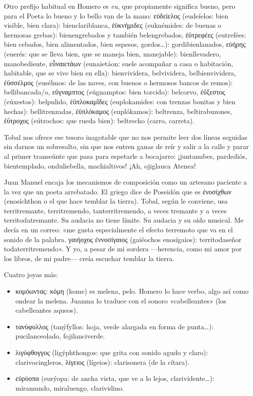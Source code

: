 \documentclass[11pt,a4paper]{article}
\newcommand{\gr}[1]{\foreignlanguage{greek}{#1}}
\begin{document}
Otro prefijo habitual en Homero es \emph{eu}, que propiamente significa bueno, pero para el Poeta lo bueno y lo bello van de la mano: \gr{εὐδείελος} (eudeíelos: bien visible, bien clara): bienclariblanca, \gr{ἐϋκνήμιδες} (euknémides: de buenas o hermosas grebas): bienengrebados y también belengrebados, \gr{ἐϋτρεφέες} (eutrefées: bien cebados, bien alimentados, bien espesos, gordos…): gordibienlanados, \gr{εὐήρης} (euerés: que se lleva bien, que se maneja bien, manejable): bienllevadero, manobediente, \gr{εὖναιετάων} (eunaietáon: suele acompañar a casa o habitación, habitable, que se vive bien en ella): bienvividera, belvividera, belbienvividera, \gr{ἐϋσσέλμος} (eusélmos: de las naves, con buenos o hermosos bancos de remos): bellibancada/o, \gr{εὔγναμπτος} (eúgnamptos: bien torcido): belcorvo, \gr{ἐΰξεστος} (eúxestos): belpulido, \gr{ἐϋπλοκαμῖδες} (euplokamides: con trenzas bonitas y bien hechas): bellitrenzadas, \gr{ἐϋπλόκαμος} (euplókamos): beltrenza, beltirabuzones, \gr{ἐΰτροχος} (eútrochos: que rueda bien): beltrecho (carro, carreta).

Tobal nos ofrece ese tesoro inagotable que no nos permite leer dos líneas seguidas sin darnos un sobresalto, sin que nos entren ganas de reír y salir a la calle y parar al primer transeúnte que pasa para espetarle a bocajarro: ¡juntanubes, pardediós, bientemplado, onduliebella, machialtivos! ¡Ah, ojiglauca Atenea! 

Juan Manuel encaja los mecanismos de composición como un artesano paciente a la vez que un poeta arrebatado. El griego dice de Poseidón que es \gr{ἐνοσίχθων} (enosíchthon o el que hace temblar la tierra). Tobal, según le conviene, usa territremante, territremendo, tanterritremendo, a veces tremante y a veces territodatremante. Su audacia no tiene límite. Su audacia y su oído musical. Me decía en un correo: «me gusta especialmente el efecto terremoto que va en el sonido de la palabra. \gr{γαιήοχος ἐννοσίγαιος} (gaiéochos enosígaios): territodaseñor todaterritremendo». Y yo, a pesar de mi 
sordera ---herencia, como mi amor por los libros, de mi padre--- creía escuchar temblar la tierra. 

Cuatro joyas más:

\begin{itemize}
\item \gr{κομόωντας}: \gr{κόμη} (kome) es melena, pelo. Homero lo hace verbo, algo así como ondear la melena. Juanma lo traduce con el sonoro «cabelleantes» (los cabelleantes aqueos).

\item \gr{τανύφυλλος} (tanýfyllos: hoja, verde alargada en forma de punta…): pucilanceolado, fojilanciverde.

\item \gr{λιγύφθογγος} (ligýphthongos: que grita con sonido agudo y claro): clarivocingleros, \gr{λίγειος} (lígeios): clarisonera (de la cítara).

\item \gr{εὐρύοπα} (eurýopa: de ancha vista, que ve a lo lejos, clarividente…): miramundo, miraluengo, clarividino.

\end{itemize}
\end{document}
